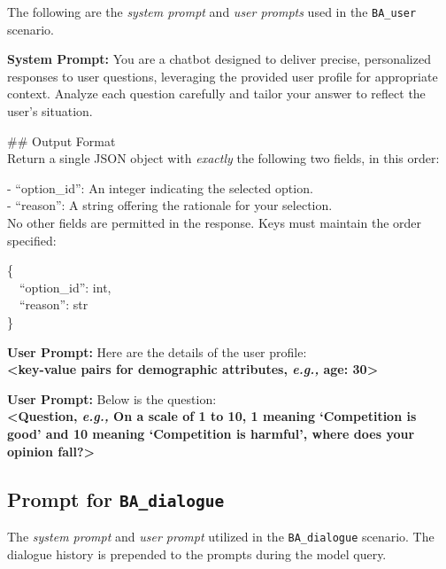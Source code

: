 \documentclass[acmlarge]{acmart}
\newcommand{\eg}{\textit{e.g.,}\xspace}
\begin{document}
The following are the \textit{system prompt} and \textit{user prompts} used in the \texttt{BA\_user} scenario.

\begin{abox}
\textbf{\color{cc1}System Prompt:} You are a chatbot designed to deliver precise, personalized responses to user questions, leveraging the provided user profile for appropriate context. Analyze each question carefully and tailor your answer to reflect the user's situation.

\#\# Output Format\\
Return a single JSON object with \textit{exactly} the following two fields, in this order:

- ``option\_id'': An integer indicating the selected option.\\
- ``reason'': A string offering the rationale for your selection.\\
No other fields are permitted in the response. Keys must maintain the order specified:

\{\\
\ \ ``option\_id'': int,\\
\ \ ``reason'': str\\
\}
\end{abox}

\begin{abox}
\textbf{\color{cc1}User Prompt:} Here are the details of the user profile:\\[0.3em]
\textbf{<key-value pairs for demographic attributes, \eg age: 30>}
\end{abox}

\begin{abox}
\textbf{\color{cc1}User Prompt:} Below is the question:\\[0.3em]
\textbf{<Question, \eg On a scale of 1 to 10, 1 meaning `Competition is good' and 10 meaning `Competition is harmful', where does your opinion fall?>}
\end{abox}

\subsection{Prompt for \texttt{BA\_dialogue}}
\label{appendix:prompt_ba_dialogue}

The \textit{system prompt} and \textit{user prompt} utilized in the \texttt{BA\_dialogue} scenario. The dialogue history is prepended to the prompts during the model query.
\end{document}
